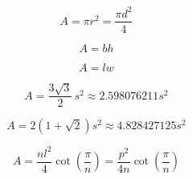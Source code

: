 






\[\begin{equation} A = \pi r^2 = \frac{\pi d^2}{4} \end{equation}\]

\[\begin{equation} A = b h \end{equation}\]

\[\begin{equation} A = l w \end{equation}\]

\[\begin{equation} A = \frac{3 \sqrt{3}}{2} \, s^2 \approx 2.598076211 s^2 \end{equation}\]

\[\begin{equation} A = 2 \left( 1 + \sqrt{2} \right) s^2 \approx 4.828427125 s^2 \end{equation}\]

\[\begin{equation} A = \frac{n l^2 }{4} \cot \left( \frac{\pi}{n} \right) = \frac{p^2}{4n} \cot \left( \frac{\pi}{n} \right) \end{equation}\]


